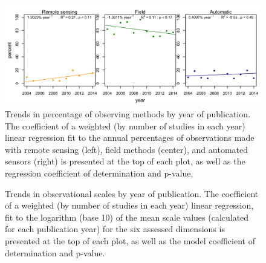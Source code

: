 \documentclass[12pt]{article}
\begin{document}
\begin{figure}[!ht]
\includegraphics[width=1\textwidth]{../vignettes/figures/figS4.png}
\vspace{10 pt}
\caption{Trends in percentage of observing methods by year of publication. The coefficient of a weighted (by number of studies in each year) linear regression fit to the annual percentages of observations made with remote sensing (left), field methods (center), and automated sensors (right) is presented at the top of each plot, as well as the regression coefficient of determination and p-value. }
\label{type_by_yr}
\end{figure}

\begin{figure}[ht]
\vspace{5 pt}
\caption{Trends in observational scales by year of publication. The coefficient of a weighted (by number of studies in each year) linear regression, fit to the logarithm (base 10) of the mean scale values (calculated for each publication year) for the six assessed dimensions is presented at the top of each plot, as well as the model coefficient of determination and p-value. }
\label{sc_by_yr}
\end{figure}
\end{document}
